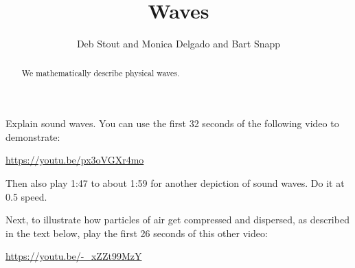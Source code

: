 \documentclass[12pt,noauthor,nooutcomes,hints,handout]{ximera}
\author{Deb Stout and Monica Delgado and Bart Snapp}
\title{Waves}
\begin{document}
\begin{abstract}
  We mathematically describe physical waves.
\end{abstract}
\maketitle











\begin{instructorNotes}
Explain sound waves. You can use the first 32 seconds of the following video to demonstrate:
\begin{center}
\url{https://youtu.be/px3oVGXr4mo}
\end{center}
Then also play 1:47 to about 1:59 for another depiction of sound waves. Do it at 0.5 speed.

Next, to illustrate how particles of air get compressed and dispersed, as described in the text below, play the first 26 seconds of this other video:
\begin{center}
    \url{https://youtu.be/-_xZZt99MzY}
\end{center}

\end{instructorNotes}
\end{document}
